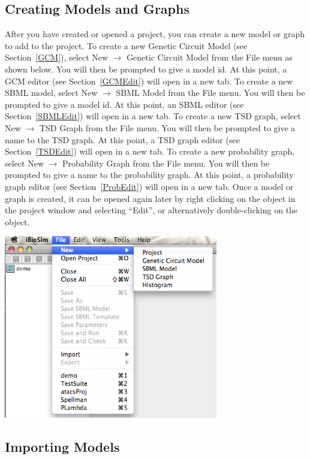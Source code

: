 \documentclass[titlepage,11pt]{article}
\begin{document}
\clearpage

\subsection{Creating Models and Graphs}

\noindent
After you have created or opened a project, you can create a
new model or graph to add to the project.  To create a new 
Genetic Circuit Model (see Section~\ref{GCM}), select 
New $\rightarrow$ Genetic Circuit Model from the
File menu as shown below. You will then be prompted to give a model id. At this
point, a GCM editor (see Section~\ref{GCMEdit}) will open in a new
tab. To create a new SBML model, select New $\rightarrow$ SBML Model
from the File menu. You will then be prompted to give a model id.
At this point, an SBML editor (see Section~\ref{SBMLEdit}) will open
in a new tab. To create a new TSD graph, select New $\rightarrow$ TSD Graph
from the File menu. You will then be prompted to give a name to
the TSD graph.  At this point, a TSD graph editor (see Section~\ref{TSDEdit})
will open in a new tab. To create a new probability graph, select 
New $\rightarrow$ Probability Graph from the File menu. You will then
be prompted to give a name to the probability graph. At this point, a 
probability graph editor (see Section~\ref{ProbEdit})
will open in a new tab. Once a model or graph is created, it can
be opened again later by right clicking on the object in the
project window and selecting ``Edit'', or alternatively
double-clicking on the object.
\begin{center}
\includegraphics[height=80mm]{screenshots/newModel}
\end{center}

\clearpage

\subsection{Importing Models}
\end{document}
